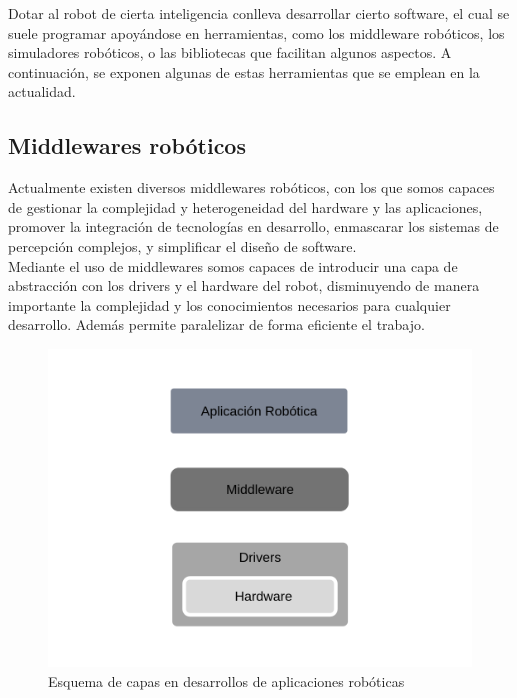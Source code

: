 Dotar al robot de cierta inteligencia conlleva desarrollar cierto software, el cual se suele programar apoyándose en herramientas, como los middleware robóticos, los simuladores robóticos, o las  bibliotecas que facilitan algunos aspectos. A continuación, se exponen algunas de estas herramientas que se emplean en la actualidad.\\

\subsection{Middlewares robóticos}

Actualmente existen diversos middlewares robóticos, con los que somos capaces de gestionar la complejidad y heterogeneidad del hardware y las aplicaciones, promover la integración de tecnologías en desarrollo, enmascarar los sistemas de percepción complejos, y simplificar el diseño de software.\\

Mediante el uso de middlewares somos capaces de introducir una capa de abstracción con los drivers y el hardware del robot, disminuyendo de manera importante la complejidad y los conocimientos necesarios para cualquier desarrollo. Además permite paralelizar de forma eficiente el trabajo.\\

\begin{figure}[H]
    	\centering
     	\includegraphics[scale=0.40]{img/middleware.png}
  		\caption{Esquema de capas en desarrollos de aplicaciones robóticas}
  		\label{fig:middleware}
\end{figure}

